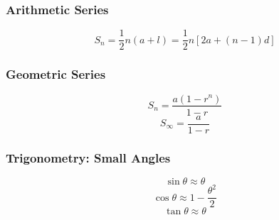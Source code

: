 \documentclass{book}
\begin{document}
                \subsubsection{Arithmetic Series}
                \begin{equation} \label{eq:arithmetic_series_finite_sum}
                    S_n=\frac{1}{2}n(a+l)=\frac{1}{2}n[2a+(n-1)d]
                \end{equation}

                \subsubsection{Geometric Series}
                \begin{equation} \label{eq:geometric_series_finite_sum}
                    S_n=\frac{a(1-r^n)}{1-r}
                \end{equation}
                \begin{equation} \label{eq:geometric_series_infinite_sum}
                    S_\infty=\frac{a}{1-r}
                \end{equation}

            \subsubsection{Trigonometry: Small Angles}
                \begin{equation} \label{sine_small_angle}
                    \sin\theta\approx\theta
                \end{equation}
                \begin{equation} \label{cosine_small_angle}
                    \cos\theta\approx1-\frac{\theta^2}{2}
                \end{equation}
                \begin{equation} \label{tangent_small_angle}
                    \tan\theta\approx\theta
                \end{equation}
\end{document}
